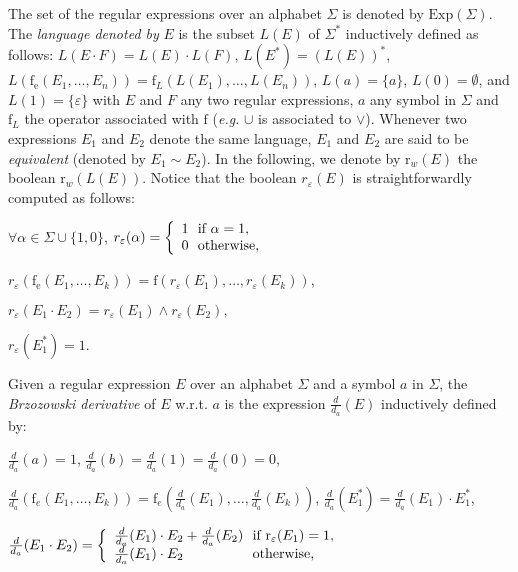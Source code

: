 \documentclass{article}
\begin{document}
  The set of the regular expressions over an alphabet $\Sigma$ is denoted by $\mathrm{Exp}(\Sigma)$.
  The \emph{language denoted by} $E$ is the subset $L(E)$ of $\Sigma^{*}$ inductively defined as follows: $L(E\cdot F)=L(E)\cdot L(F)$, $L(E^*)=(L(E))^{*}$, $L(\mathrm{f}_{\mathrm{e}}(E_1,\ldots,E_n))=\mathrm{f}_L(L(E_1),\ldots,L(E_n))$, $L(a)=\{a\}$, $L(0)=\emptyset$, and $L(1)=\{\varepsilon\}$ with $E$ and $F$ any two regular expressions, $a$ any symbol in $\Sigma$ and $\mathrm{f}_L$ the operator associated with $\mathrm{f}$ (\emph{e.g.} $\cup$ is associated to $\vee$). Whenever two expressions $E_1$ and $E_2$ denote the same language, $E_1$ and $E_2$ are said to be \emph{equivalent} (denoted by $E_1\sim E_2$).
In the following, we denote by $\mathrm{r}_w(E)$ the boolean $\mathrm{r}_w(L(E))$.	  
Notice that the boolean $r_\varepsilon(E)$ is straightforwardly computed as follows:
	  
	  \centerline{
	    $\forall \alpha\in\Sigma\cup\{1,0\}$, $r_\varepsilon(\alpha)=
	      \left\{
	        \begin{array}{l@{\ }l}
	          1 & \text{ if } \alpha=1,\\
	          0 & \text{ otherwise,}\\
	        \end{array}
	      \right.$
	  }
	  
	  \centerline{
	    $r_\varepsilon(\mathrm{f}_{\mathrm{e}}(E_1,\ldots,E_k))=\mathrm{f}(r_\varepsilon(E_1),\ldots,r_\varepsilon(E_k))$,
	  }
	  
	  \centerline{
	    $r_\varepsilon(E_1\cdot E_2)= r_{\varepsilon}(E_1)\wedge r_{\varepsilon}(E_2),$
	  }
	  
	  \centerline{
	    $r_\varepsilon(E_1^*)=1$.
	  }
	  
Given a regular expression $E$ over an alphabet $\Sigma$ and a symbol $a$ in $\Sigma$, the \emph{Brzozowski derivative} of $E$ w.r.t. $a$ is the expression $\frac{d}{d_a}(E)$ inductively defined by:

\centerline{ $\frac{d}{d_a}(a)=1$, $\frac{d}{d_a}(b)=\frac{d}{d_a}(1)=\frac{d}{d_a}(0)=0$,}

\centerline{ $\frac{d}{d_a}(\mathrm{f}_e(E_1,\ldots,E_k))=\mathrm{f}_e(\frac{d}{d_a}(E_1),\ldots,\frac{d}{d_a}(E_k))$, $\frac{d}{d_a}(E_1^*)=\frac{d}{d_a}(E_1)\cdot E_1^*$,}

\centerline{
  $\frac{d}{d_a}(E_1\cdot E_2)=
    \left\{
      \begin{array}{l@{\ }l}
        \frac{d}{d_a}(E_1)\cdot E_2 + \frac{d}{d_a}(E_2) & \text{ if } \mathrm{r}_\varepsilon(E_1)=1,\\
        \frac{d}{d_a}(E_1)\cdot E_2 & \text{ otherwise,}\\
      \end{array}
    \right.
  $}
  
\end{document}
